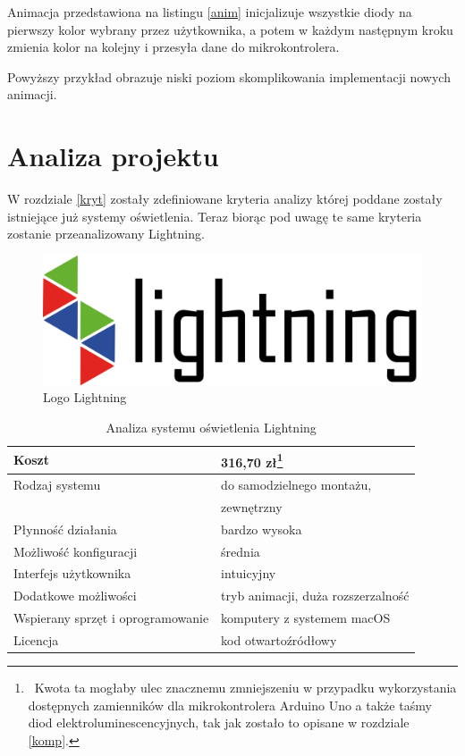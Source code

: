 \documentclass[12pt]{report}
\begin{document}
Animacja przedstawiona na listingu \ref{anim} inicjalizuje wszystkie diody na pierwszy kolor wybrany przez użytkownika, a potem w każdym następnym kroku zmienia kolor na kolejny i przesyła dane do mikrokontrolera.

 \label{anims}

Powyższy przykład obrazuje niski poziom skomplikowania implementacji nowych animacji.

\section{Analiza projektu}

W rozdziale \ref{kryt} zostały zdefiniowane kryteria analizy której poddane zostały istnie\-jące już systemy oświetlenia. Teraz biorąc pod uwagę te same kryteria zostanie przeanalizowany Lightning.

\begin{figure}[h]
\centering
\includegraphics[width=\textwidth]{../resources/logo.png}
\caption{Logo Lightning}
\end{figure}

\begin{table}[h]
\centering
\begin{tabular}{| l | l |} 
\hline 
Koszt & 316,70 zł\footnote{~Kwota ta mogłaby ulec znacznemu zmniejszeniu w przypadku wykorzystania dostępnych zamienników dla mikrokontrolera Arduino Uno a także taśmy diod elektroluminescencyjnych, tak jak zostało to opisane w rozdziale \ref{komp}.}\\ \hline
Rodzaj systemu & do samodzielnego montażu, \\ \hline
& zewnętrzny \\ \hline
Płynność działania & bardzo wysoka \\ \hline
Możliwość konfiguracji & średnia  \\ \hline
Interfejs użytkownika & intuicyjny  \\ \hline
Dodatkowe możliwości &  tryb animacji, duża rozszerzalność \\ \hline
Wspierany sprzęt i oprogramowanie &  komputery z systemem macOS  \\ \hline
Licencja & kod otwartoźródłowy  \\ \hline
\end{tabular} 
\caption{Analiza systemu oświetlenia Lightning}
\end{table}
\end{document}
